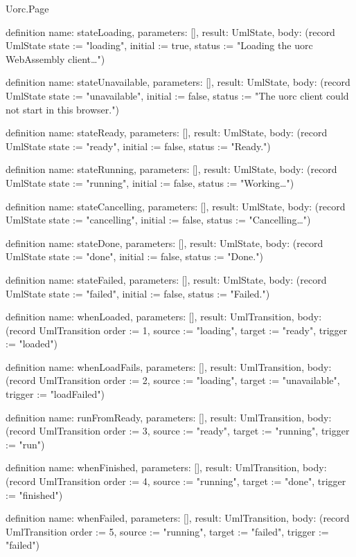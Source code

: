 \begin{lexlean}{Uorc.Page}
\begin{semanticmodule}
definition{
  name: stateLoading,
  parameters: [],
  result: UmlState,
  body: (record UmlState {state := "loading", initial := true, status := "Loading the uorc WebAssembly client…"})
}

definition{
  name: stateUnavailable,
  parameters: [],
  result: UmlState,
  body: (record UmlState {state := "unavailable", initial := false, status := "The uorc client could not start in this browser."})
}

definition{
  name: stateReady,
  parameters: [],
  result: UmlState,
  body: (record UmlState {state := "ready", initial := false, status := "Ready."})
}

definition{
  name: stateRunning,
  parameters: [],
  result: UmlState,
  body: (record UmlState {state := "running", initial := false, status := "Working…"})
}

definition{
  name: stateCancelling,
  parameters: [],
  result: UmlState,
  body: (record UmlState {state := "cancelling", initial := false, status := "Cancelling…"})
}

definition{
  name: stateDone,
  parameters: [],
  result: UmlState,
  body: (record UmlState {state := "done", initial := false, status := "Done."})
}

definition{
  name: stateFailed,
  parameters: [],
  result: UmlState,
  body: (record UmlState {state := "failed", initial := false, status := "Failed."})
}

definition{
  name: whenLoaded,
  parameters: [],
  result: UmlTransition,
  body: (record UmlTransition {order := 1, source := "loading", target := "ready", trigger := "loaded"})
}

definition{
  name: whenLoadFails,
  parameters: [],
  result: UmlTransition,
  body: (record UmlTransition {order := 2, source := "loading", target := "unavailable", trigger := "loadFailed"})
}

definition{
  name: runFromReady,
  parameters: [],
  result: UmlTransition,
  body: (record UmlTransition {order := 3, source := "ready", target := "running", trigger := "run"})
}

definition{
  name: whenFinished,
  parameters: [],
  result: UmlTransition,
  body: (record UmlTransition {order := 4, source := "running", target := "done", trigger := "finished"})
}

definition{
  name: whenFailed,
  parameters: [],
  result: UmlTransition,
  body: (record UmlTransition {order := 5, source := "running", target := "failed", trigger := "failed"})
}


\end{semanticmodule}
\end{lexlean}
